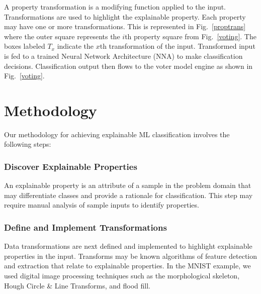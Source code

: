 \documentclass[conference]{IEEEtran}
\begin{document}
A property transformation is a modifying function applied to the input.  Transformations are used to highlight the explainable property.  Each property may have one or more transformations.   This is represented in Fig.~\ref{proptrans} where the outer square represents the $i$th property square from Fig.~\ref{voting}.  The boxes labeled $T_x$ indicate the $x$th transformation of the input.  Transformed input is fed to a trained Neural Network Architecture (NNA) to make classification decisions.  Classification output then flows to the voter model engine as shown in Fig.~\ref{voting}.

\section{Methodology}
 
Our methodology for achieving explainable ML classification involves the following steps:

\subsubsection{Discover Explainable Properties}
An explainable property is an attribute of a sample in the problem domain that may differentiate classes and provide a rationale for classification.  This step may require manual analysis of sample inputs to identify properties.

\subsubsection{Define and Implement Transformations}
Data transformations are next defined and implemented to highlight explainable properties in the input.  Transforms may be known algorithms of feature detection and extraction that relate to explainable properties.  In the MNIST example, we used digital image processing techniques such as the morphological skeleton, Hough Circle \& Line Transforms, and flood fill.
\end{document}
